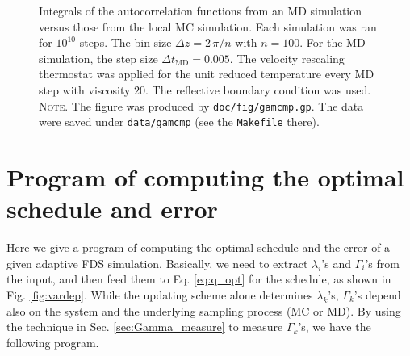 \documentclass[reprint, floatfix]{revtex4-1}
\newcommand{\note}[1]{{\color{DarkGreen}\footnotesize \textsc{Note.} #1}}
\begin{document}
\begin{figure}[h]
\begin{center}
  \caption{
    \label{fig:gamcmp}
    Integrals of the autocorrelation functions
    from an MD simulation versus those
    from the local MC simulation.
    Each simulation was ran for $10^{10}$ steps.
    The bin size $\Delta z = 2\, \pi /n$ with $n = 100$.
    For the MD simulation,
    the step size $\Delta t_\mathrm{MD} = 0.005$.
    The velocity rescaling thermostat\cite{bussi2007} was
    applied for the unit reduced temperature
    every MD step with viscosity $20$.
    The reflective boundary condition was used.
    \note{The figure was produced by \texttt{doc/fig/gamcmp.gp}.
      The data were saved under \texttt{data/gamcmp}
      (see the \texttt{Makefile} there).
    }%
  }
\end{center}
\end{figure}






\section{\label{sec:program}
Program of computing the optimal schedule and error
}


Here we give a program of computing
the optimal schedule and the error
of a given adaptive FDS simulation.
%
Basically, we need to extract
$\lambda_i$'s and $\Gamma_i$'s
from the input,
and then feed them to Eq. \eqref{eq:q_opt}
for the schedule,
as shown in Fig. \ref{fig:vardep}.
%
%
While the updating scheme alone
determines $\lambda_k$'s,
$\Gamma_k$'s depend also on the system
and the underlying sampling process (MC or MD).
%
By using the technique in Sec. \ref{sec:Gamma_measure}
to measure $\Gamma_k$'s,
we have the following program.
\end{document}
